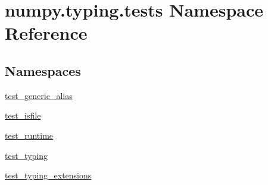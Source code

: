 \hypertarget{namespacenumpy_1_1typing_1_1tests}{}\section{numpy.\+typing.\+tests Namespace Reference}
\label{namespacenumpy_1_1typing_1_1tests}
\subsection*{Namespaces}
\begin{DoxyCompactItemize}
\item 
 \hyperlink{namespacenumpy_1_1typing_1_1tests_1_1test__generic__alias}{test\+\_\+generic\+\_\+alias}
\item 
 \hyperlink{namespacenumpy_1_1typing_1_1tests_1_1test__isfile}{test\+\_\+isfile}
\item 
 \hyperlink{namespacenumpy_1_1typing_1_1tests_1_1test__runtime}{test\+\_\+runtime}
\item 
 \hyperlink{namespacenumpy_1_1typing_1_1tests_1_1test__typing}{test\+\_\+typing}
\item 
 \hyperlink{namespacenumpy_1_1typing_1_1tests_1_1test__typing__extensions}{test\+\_\+typing\+\_\+extensions}
\end{DoxyCompactItemize}
